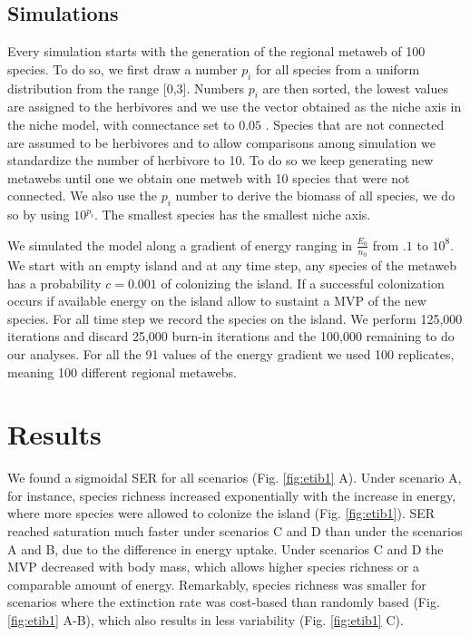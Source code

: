 \subsection{Simulations}\label{simulations}

Every simulation starts with the generation of the regional metaweb of
100 species. To do so, we first draw a number \(p_i\) for all species
from a uniform distribution from the range {[}0,3{]}. Numbers \(p_i\)
are then sorted, the lowest values are assigned to the herbivores and we
use the vector obtained as the niche axis in the niche model, with
connectance set to \(0.05\) \citep{Williams2000}. Species that are not
connected are assumed to be herbivores and to allow comparisons among
simulation we standardize the number of herbivore to 10. To do so we
keep generating new metawebs until one we obtain one metweb with 10
species that were not connected. We also use the \(p_i\) number to
derive the biomass of all species, we do so by using \(10^{p_i}\). The
smallest species has the smallest niche axis.

We simulated the model along a gradient of energy ranging in
\(\frac{E_0}{n_0}\) from \(.1\) to \(10^8\). We start with an empty
island and at any time step, any species of the metaweb has a
probability \(c=0.001\) of colonizing the island. If a successful
colonization occurs if available energy on the island allow to sustaint
a MVP of the new species. For all time step we record the species on the
island. We perform 125,000 iterations and discard 25,000 burn-in
iterations and the 100,000 remaining to do our analyses. For all the 91
values of the energy gradient we used 100 replicates, meaning 100
different regional metawebs.

\section{Results}\label{results}

We found a sigmoidal SER for all scenarios (Fig. \ref{fig:etib1} A).
Under scenario A, for instance, species richness increased exponentially
with the increase in energy, where more species were allowed to colonize
the island (Fig. \ref{fig:etib1}). SER reached saturation much faster
under scenarios C and D than under the scenarios A and B, due to the
difference in energy uptake. Under scenarios C and D the MVP decreased
with body mass, which allows higher species richness or a comparable
amount of energy. Remarkably, species richness was smaller for scenarios
where the extinction rate was cost-based than randomly based (Fig.
\ref{fig:etib1} A-B), which also results in less variability (Fig.
\ref{fig:etib1} C).

